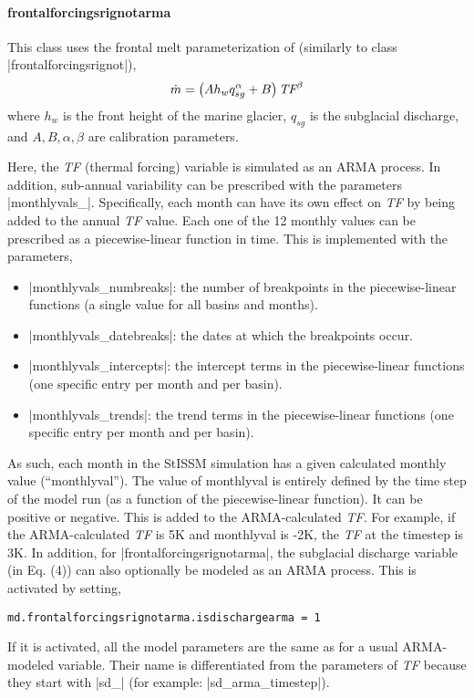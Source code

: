 \paragraph{frontalforcingsrignotarma}
This class uses the frontal melt parameterization of \cite{Rignot2016} (similarly to class \lstinlinebg|frontalforcingsrignot|),
\begin{equation} \label{eq4}
	\dot{m} = \left(A h_{w} q_{sg}^{\alpha} + B\right)\emph{TF}^{\beta}
\end{equation}
where $h_{w}$ is the front height of the marine glacier, $q_{sg}$ is the subglacial discharge, and $A,B,\alpha,\beta$ are calibration parameters.

Here, the \emph{TF} (thermal forcing) variable is simulated as an ARMA process. In addition,
sub-annual variability can be prescribed with the parameters \lstinlinebg|monthlyvals_|.
Specifically, each month can have its own effect on \emph{TF} by being added to the annual \emph{TF} value. Each one of the 12 monthly values can be prescribed as a piecewise-linear function in time. This is implemented with the parameters,
\begin{itemize}
	\item \lstinlinebg|monthlyvals_numbreaks|: the number of breakpoints in the piecewise-linear functions (a single value for all basins and months).
	\item \lstinlinebg|monthlyvals_datebreaks|: the dates at which the breakpoints occur.
	\item \lstinlinebg|monthlyvals_intercepts|: the intercept terms in the piecewise-linear functions (one specific entry per month and per basin).
	\item \lstinlinebg|monthlyvals_trends|: the trend terms in the piecewise-linear functions (one specific entry per month and per basin).
\end{itemize}
As such, each month in the StISSM simulation has a given calculated monthly value (“monthlyval”). The value of monthlyval is entirely defined by the time step of the model run (as a function of the piecewise-linear function). It can be positive or negative. This is added to the ARMA-calculated \emph{TF}. For example, if the ARMA-calculated \emph{TF} is 5K and monthlyval is -2K, the \emph{TF} at the timestep is 3K. In addition, for \lstinlinebg|frontalforcingsrignotarma|, the subglacial discharge variable (in Eq. (4)) can also optionally be modeled as an ARMA process. This is activated by setting,
\begin{lstlisting}
md.frontalforcingsrignotarma.isdischargearma = 1
\end{lstlisting}
If it is activated, all the model parameters are the same as for a usual ARMA-modeled variable. Their name is differentiated from the parameters of \emph{TF} because they start with \lstinlinebg|sd_| (for example: \lstinlinebg|sd_arma_timestep|).

